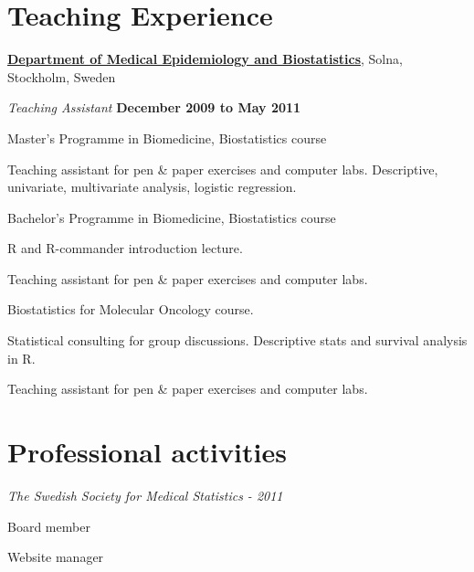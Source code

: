 %
%
\section{Teaching Experience}
\href{http://ki.se/ki/jsp/polopoly.jsp?d=9600}{\textbf{Department of Medical Epidemiology and Biostatistics}}, Solna, Stockholm, Sweden
\begin{outerlist}
\item[] \textit{Teaching Assistant}
    \hfill \textbf{December 2009 to May 2011}
    \begin{innerlist}

        \item Master's Programme in Biomedicine, Biostatistics course
        \begin{innerlist}
	    \item Teaching assistant for pen \& paper exercises and computer labs. Descriptive, univariate, multivariate analysis, logistic regression.
        \end{innerlist}

        \halfblankline

        \item Bachelor's Programme in Biomedicine, Biostatistics course
        \begin{innerlist}
	    \item R and R-commander introduction lecture.
	    \item Teaching assistant for pen \& paper exercises and computer labs.
        \end{innerlist}

        \halfblankline

	\item Biostatistics for Molecular Oncology course.
        \begin{innerlist}
            \item Statistical consulting for group discussions. Descriptive stats and survival analysis in R.
	    \item Teaching assistant for pen \& paper exercises and computer labs.
        \end{innerlist}

    \end{innerlist}
\end{outerlist}

\section{Professional activities}
\textit{The Swedish Society for Medical Statistics - 2011}
\begin{innerlist}
    \item{Board member}
    \item{Website manager}
\end{innerlist}

